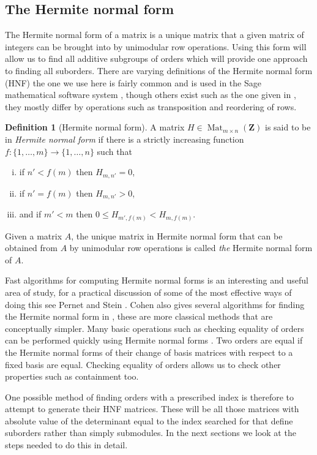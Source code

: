 \documentclass[12pt,a4paper,abstracton,bibtotoc]{scrreprt}
\theoremstyle{definition}
\newtheorem{defn}{Definition}
\newcommand{\ZZ}{\mathbf{Z}}
\DeclareMathOperator{\Mat}{Mat}
\begin{document}
\subsection{The Hermite normal form}
The Hermite normal form of a matrix is a unique matrix that a given matrix of integers can be brought into by unimodular row operations.
Using this form will allow us to find all additive subgroups of orders which will provide one approach to finding all suborders.
There are varying definitions of the Hermite normal form (HNF) the one we use here is fairly common and is used in the Sage mathematical software system \cite{sage}, though others exist such as the one given in \cite{cohen93}, they mostly differ by operations such as transposition and reordering of rows.

\begin{defn}[Hermite normal form]
A matrix $H\in\Mat_{m\times n}(\ZZ)$ is said to be in \emph{Hermite normal form} if there is a strictly increasing function $f\colon \{1, \ldots, m\} \to \{1,\ldots , n\}$ such that
\begin{enumerate}[i)]
\item if $n' < f(m)$ then $H_{m,n'} = 0$,
\item if $n' = f(m)$ then $H_{m,n'} > 0$,
\item and if $m' < m$ then $0\le H_{m',f(m)} < H_{m,f(m)}$.
\end{enumerate}

Given a matrix $A$, the unique matrix in Hermite normal form that can be obtained from $A$ by unimodular row operations is called \emph{the} Hermite normal form of $A$.
\end{defn}

Fast algorithms for computing Hermite normal forms is an interesting and useful area of study, for a practical discussion of some of the most effective ways of doing this see Pernet and Stein \cite{pernetstein}.
Cohen also gives several algorithms for finding the Hermite normal form in \cite{cohen93}, these are more classical methods that are conceptually simpler.
Many basic operations such as checking equality of orders can be performed quickly using Hermite normal forms \cite{cohen93}.
Two orders are equal if the Hermite normal forms of their change of basis matrices with respect to a fixed basis are equal.
Checking equality of orders allows us to check other properties such as containment too.

One possible method of finding orders with a prescribed index is therefore to attempt to generate their HNF matrices.
These will be all those matrices with absolute value of the determinant equal to the index searched for that define suborders rather than simply submodules.
In the next sections we look at the steps needed to do this in detail.
\end{document}

